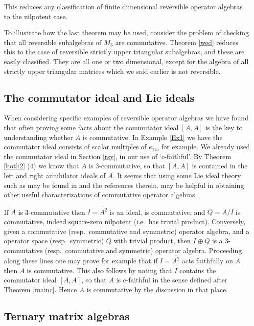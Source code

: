 \documentclass{amsart}
\theoremstyle{remark}
\theoremstyle{definition}
\numberwithin{equation}{section}
\begin{document}
  This reduces any classification of finite dimensional 
     reversible  operator  algebras to the nilpotent case.

To illustrate how the last theorem may be used, consider the problem of checking that all reversible subalgebras of $M_3$ are commutative.   
Theorem \ref{wed} reduces this to the case of reversible strictly upper triangular subalgebras, and these are easily classified.  They are all one or two dimensional, except for the algebra of all strictly upper triangular matrices which we said earlier is not reversible.  


\subsection{The commutator ideal and Lie ideals} When considering  specific examples of reversible operator algebras we have found that often proving some facts about the commutator ideal $[A,A]$ is the key to understanding whether $A$ is commutative.  
In Example \ref{Ex1} we have the commutator ideal consists of scalar multiples of $e_{14}$, for example.  We already used  the commutator ideal  in Section \ref{rsy}, in our use of `c-faithful'. By Theorem 
\ref{both2} (4) we know that $A$ is 3-commutative, so that
$[A,A]$ is contained in the left and right annihilator ideals of $A$. 
It seems that using some Lie ideal theory such as may be found in \cite{Thiel} and the references therein, may be helpful in obtaining other useful characterizations of commutative operator algebras.

If $A$ is 3-commutative then $I = \overline{A^2}$ is an ideal, is commutative, and $Q = A/I$ is commutative, indeed 
    square-zero nilpotent (i.e.\ has trivial product).   Conversely, given a commutative (resp.\ commutative and symmetric) operator algebra,
    and a  operator space  (resp.\  symmetric) $Q$ with trivial product, then $I \oplus Q$ is a 3-commutative (resp.\ commutative and symmetric) operator algebra. 
Proceeding along these lines one may prove for example that if $I= \overline{A^2}$ acts faithfully on $A$  then $A$ is commutative.  This also follows by 
noting that $I$ contains the commutator ideal 
  $[A,A]$, so that $A$ is c-faithful in the sense defined after 
Theorem \ref{mainc}.  Hence $A$ is commutative by the discussion in that place. 
  

  

\subsection{Ternary matrix algebras}
\end{document}

